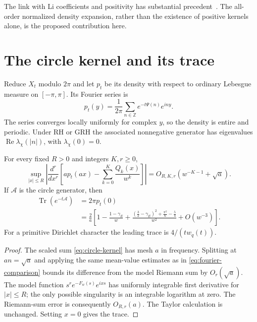 The link with Li coefficients and positivity has substantial precedent~\cite{Lagarias2007,NakamuraSuzuki2023}.
The all-order normalized density expansion, rather than the existence
of positive kernels alone, is the proposed contribution here.

\section{The circle kernel and its trace}

Reduce $X_t$ modulo $2\pi$ and let $p_t$ be its density with respect to
ordinary Lebesgue measure on $[-\pi,\pi]$. Its Fourier series is
\begin{equation}\label{eq:circle-kernel}
 p_t(y)=\frac1{2\pi}\sum_{n\in\mathbb Z}e^{-t\Psi(n)}e^{iny}.
\end{equation}
The series converges locally uniformly for complex $y$, so the density
is entire and periodic. Under RH or GRH the associated nonnegative generator has eigenvalues
$\operatorname{Re}\lambda_\chi(|n|)$, with $\lambda_\chi(0)=0$.

\begin{proposition}
For every fixed $R>0$ and integers $K,r\geq0$,
\[
 \sup_{|x|\leq R}\left|
 \frac{d^r}{dx^r}
 \left[ap_t(ax)-\sum_{k=0}^K\frac{Q_k(x)}{w^k}\right]
 \right|=O_{R,K,r}(w^{-K-1}+\sqrt a).
\]
If $\mathcal A$ is the circle generator, then
\begin{align*}
 \operatorname{Tr}(e^{-t\mathcal A})
 &=2\pi p_t(0)\\
 &=\frac2a\left[
 1-\frac{1-\gamma_{\!E}}w
 +\frac{(\frac32-\gamma_{\!E})^2+\frac{\pi^2}6-\frac54}{w^2}
 +O(w^{-3})\right].
\end{align*}
For a primitive Dirichlet character the leading trace is
$4/(t w_q(t))$.
\end{proposition}

\begin{proof}
The scaled sum \eqref{eq:circle-kernel} has mesh $a$ in frequency.
Splitting at $an=\sqrt a$ and applying the same mean-value estimates
as in \eqref{eq:fourier-comparison} bounds its difference from the
model Riemann sum by $O_r(\sqrt a)$. The model function
$s^r e^{-F_w(s)}e^{ixs}$ has uniformly integrable first derivative for
$|x|\leq R$; the only possible singularity is an integrable logarithm
at zero. The Riemann-sum error is consequently $O_{R,r}(a)$.
The Taylor calculation is unchanged. Setting $x=0$ gives the trace.
\end{proof}

